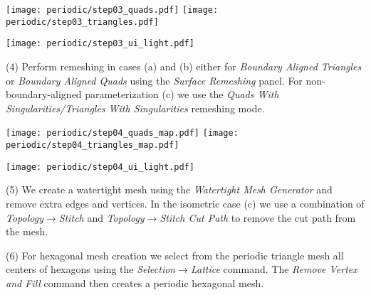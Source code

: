 \documentclass[Thesis.tex]{subfiles}
\begin{document}
\begin{compactenum}[(1)]
\begin{center}
\begin{minipage}{0.8\linewidth}
            \centering
            \texttt{[image: periodic/step03\_quads.pdf]}
            \texttt{[image: periodic/step03\_triangles.pdf]}		
\end{minipage}
\begin{minipage}{0.19\linewidth}
         	\texttt{[image: periodic/step03\_ui\_light.pdf]}
\end{minipage}
\end{center}    

\item[(4)] Perform remeshing in cases (a) and (b) either for \emph{Boundary Aligned Triangles} or \emph{Boundary Aligned Quads} using the \emph{Surface Remeshing} panel. For non-boundary-aligned parameterization (c) we use the \emph{Quads With Singularities/Triangles With Singularities} remeshing mode.\\

\begin{center}
\begin{minipage}{0.75\linewidth}
            \centering
            \texttt{[image: periodic/step04\_quads\_map.pdf]}
            \texttt{[image: periodic/step04\_triangles\_map.pdf]}
\end{minipage}
\begin{minipage}{0.24\linewidth}
\texttt{[image: periodic/step04\_ui\_light.pdf]}	
\end{minipage}
\end{center}    

\item[(5)] We create a watertight mesh using the \emph{Watertight Mesh Generator} and remove extra edges and vertices. In the isometric case (c) we use a combination of \emph{Topology$\to$Stitch} and \emph{Topology$\to$Stitch Cut Path} to remove the cut path from the mesh.
\item[(6)] For hexagonal mesh creation we select from the periodic triangle mesh all centers of hexagons using the \emph{Selection$\to$Lattice} command. The \emph{Remove Vertex and Fill} command then creates a periodic hexagonal mesh.
\begin{center}
\begin{minipage}{\linewidth}
            \centering
\end{minipage}
\end{center}                
\end{compactenum}
\end{document}
